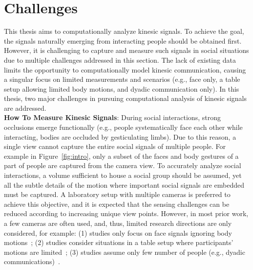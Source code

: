 \section{Challenges}
This thesis aims to computationally analyze kinesic signals. To achieve the goal, the signals naturally emerging from interacting people should be obtained first. However, it is challenging to capture and measure such signals in social situations due to multiple challenges addressed in this section. The lack of existing data limits the opportunity to computationally model kinesic communication, causing a singular focus on limited measurements and scenarios (e.g., face only, a table setup allowing limited body motions, and dyadic communication only). In this thesis, two major challenges in pursuing computational analysis of kinesic signals are addressed.\\ %

\noindent \textbf{How To Measure Kinesic Signals}:  
During social interactions, strong occlusions emerge functionally (e.g., people systematically face each other while interacting, bodies are occluded by gesticulating limbs). Due to this reason, a single view cannot capture the entire social signals of multiple people. For example in Figure~\ref{fig:intro}, only a subset of the faces and body gestures of a part of people are captured from the camera view. To accurately analyze social interactions, a volume sufficient to house a social group should be assumed, yet all the subtle details of the motion where important social signals are embedded must be captured. A laboratory setup with multiple cameras is preferred to achieve this objective, and it is expected that the sensing challenges can be reduced according to increasing unique view points. However, in most prior work, a few cameras are often used, and, thus, limited research directions are only considered, for example: (1) studies only focus on face signals ignoring body motions~\cite{messinger2009automated, lucas_trust_2016,mckeown2012semaine}; (2) studies consider situations in a table setup where participants' motions are limited~\cite{carletta2005ami, Lepri-12,messinger2009automated, nojavanasghari2016emoreact, lucas_trust_2016,mckeown2012semaine}; (3) studies assume only few number of people (e.g., dyadic communications)~\cite{messinger2009automated,nojavanasghari2016emoreact, lucas_trust_2016, katsimerou2016crowdsourcing,mckeown2012semaine,gunes2006bimodal}.

